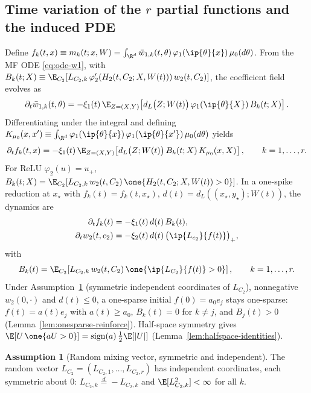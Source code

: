 \documentclass[nohyperref]{article}
\theoremstyle{plain}
\theoremstyle{definition}
\newtheorem{assumption}[theorem]{Assumption}
\theoremstyle{remark}
\begin{document}
\subsection{Time variation of the $r$ partial functions and the induced PDE}
\label{app:time-variation-pde}

Define $f_k(t,x)\equiv m_k(t;x,W)=\int_{\R^d}\bar w_{1,k}(t,\theta)\,\varphi_1(\ip{\theta}{x})\,\mu_0(d\theta)$. From the MF ODE \eqref{eq:ode-w1}, with $B_k(t;X)\equiv \E_{C_2}[L_{C_2,k}\,\varphi_2'(H_2(t,C_2;X,W(t)))\,w_2(t,C_2)]$, the coefficient field evolves as
\begin{equation}\label{eq:barw-evol}
\partial_t \bar w_{1,k}(t,\theta)
=-\xi_1(t)\,\E_{Z=(X,Y)}\!\left[d_L\big(Z;W(t)\big)\,\varphi_1(\ip{\theta}{X})\,B_k(t;X)\right].
\end{equation}
Differentiating under the integral and defining $K_{\mu_0}(x,x')\equiv \int_{\R^d}\varphi_1(\ip{\theta}{x})\,\varphi_1(\ip{\theta}{x'})\,\mu_0(d\theta)$ yields
\begin{equation}\label{eq:fk-kernel}
\partial_t f_k(t,x)=-\xi_1(t)\,\E_{Z=(X,Y)}\!\left[d_L\big(Z;W(t)\big)\,B_k(t;X)\,K_{\mu_0}(x,X)\right],\qquad k=1,\dots,r.
\end{equation}
For ReLU $\varphi_2(u)=u_+$, $B_k(t;X)=\E_{C_2}[L_{C_2,k}\,w_2(t,C_2)\,\one \{H_2(t,C_2;X,W(t))>0\}]$. In a one-spike reduction at $x_\star$ with $f_k(t)=f_k(t,x_\star)$, $d(t)=d_L((x_\star,y_\star);W(t))$, the dynamics are
\begin{align}
\partial_t f_k(t)&=-\xi_1(t)\,d(t)\,B_k(t),\label{eq:spike-f}\\
\partial_t w_2(t,c_2)&=-\xi_2(t)\,d(t)\,\big(\ip{L_{c_2}}{f(t)}\big)_+,\label{eq:spike-w2}
\end{align}
with
\begin{equation}\label{eq:spike-B}
B_k(t)=\E_{C_2}\!\left[L_{C_2,k}\,w_2(t,C_2)\,\one \!\left\{\ip{L_{C_2}}{f(t)}>0\right\}\right],\qquad k=1,\dots,r.
\end{equation} Under Assumption~\ref{assump:L-symmetric} (symmetric independent coordinates of $L_{C_2}$), nonnegative $w_2(0,\cdot)$ and $d(t)\le 0$, a one-sparse initial $f(0)=a_0 e_j$ stays one-sparse: $f(t)=a(t)e_j$ with $a(t)\ge a_0$, $B_k(t)=0$ for $k\neq j$, and $B_j(t)>0$ (Lemma~\ref{lem:onesparse-reinforce}). Half-space symmetry gives $\E[U\,\one \{aU>0\}]=\mathrm{sign}(a)\,\frac{1}{2}\E[|U|]$ (Lemma~\ref{lem:halfspace-identities}).

\begin{assumption}[Random mixing vector, symmetric and independent]\label{assump:L-symmetric}
The random vector $L_{C_2}=(L_{C_2,1},\dots,L_{C_2,r})$ has independent coordinates, each symmetric about $0$: $L_{C_2,k}\overset{d}{=}-L_{C_2,k}$ and $\E[L_{C_2,k}^2]<\infty$ for all $k$.
\end{assumption}
\end{document}
